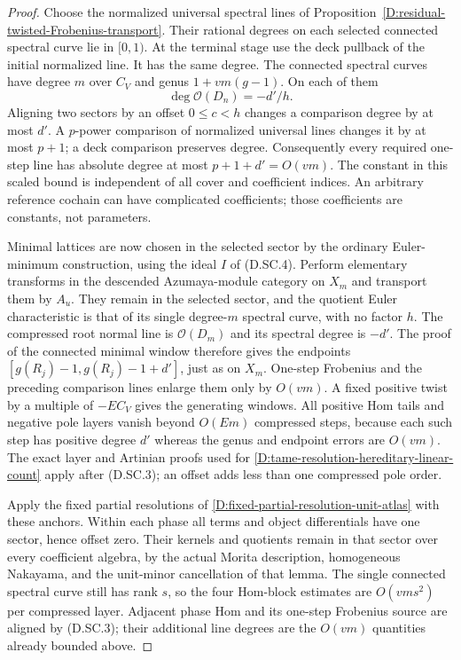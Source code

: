 \begin{proof}
Choose the normalized universal spectral lines of
Proposition~\ref{D:residual-twisted-Frobenius-transport}.
Their rational degrees on each selected connected
spectral curve lie in $[0,1)$. At the terminal stage
use the deck pullback of the initial normalized line.
It has the same degree. The connected spectral curves
have degree $m$ over $C_V$ and genus
$1+vm(g-1)$. On each of them
\[
                  \deg\mathcal O(D_n)=-d'/h.
                                                        \tag{D.SC.9}
\]
Aligning two sectors by an offset $0\leq c<h$ changes
a comparison degree by at most $d'$. A $p$-power
comparison of normalized universal lines changes
it by at most $p+1$; a deck comparison preserves
degree. Consequently every required one-step line
has absolute degree at most $p+1+d'=O(vm)$.
The constant in this scaled bound is independent of
all cover and coefficient indices. An arbitrary
reference cochain can have complicated coefficients;
those coefficients are constants, not parameters.

Minimal lattices are now chosen in the selected
sector by the ordinary Euler-minimum construction,
using the ideal $I$ of (D.SC.4). Perform elementary
transforms in the descended Azumaya-module category
on $X_m$ and transport them by $A_u$. They remain
in the selected sector, and the quotient Euler
characteristic is that of its single degree-$m$
spectral curve, with no factor $h$. The compressed root
normal line is $\mathcal O(D_m)$ and its spectral
degree is $-d'$. The proof of the connected minimal
window therefore gives the endpoints
$[g(R_j)-1,g(R_j)-1+d']$, just as on $X_m$.
One-step Frobenius and the preceding comparison
lines enlarge them only by $O(vm)$. A fixed positive
twist by a multiple of $-EC_V$ gives the generating
windows. All positive Hom tails and negative pole
layers vanish beyond $O(Em)$ compressed steps,
because each such step has positive degree $d'$
whereas the genus and endpoint errors are $O(vm)$.
The exact layer and Artinian proofs used for
\ref{D:tame-resolution-hereditary-linear-count}
apply after (D.SC.3); an offset adds less than one
compressed pole order.

Apply the fixed partial resolutions of
\ref{D:fixed-partial-resolution-unit-atlas} with
these anchors. Within each phase all terms and
object differentials have one sector, hence offset
zero. Their kernels and quotients remain in that
sector over every coefficient algebra, by the
actual Morita description, homogeneous Nakayama,
and the unit-minor cancellation of that lemma.
The single connected spectral curve still has
rank $s$, so the four Hom-block estimates are
$O(vm s^2)$ per compressed layer. Adjacent phase
Hom and its one-step Frobenius source are aligned
by (D.SC.3); their additional line degrees are the
$O(vm)$ quantities already bounded above.


\end{proof}
